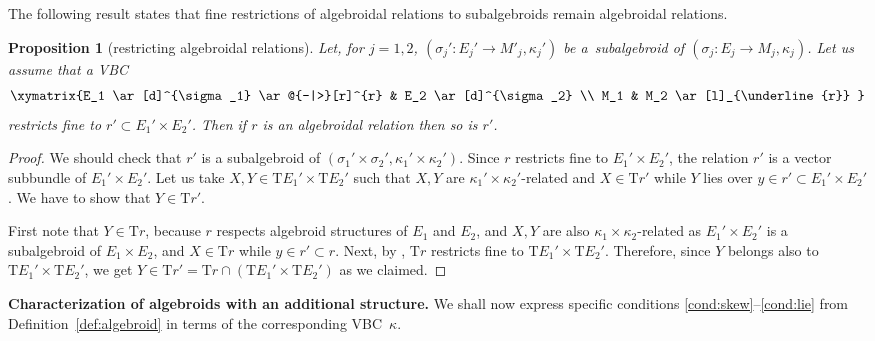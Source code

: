 \documentclass[pdftex]{sigma}
\newcommand{\ZM}{{VBC}} %
\newcommand{\und}{\underline}
\newcommand{\ra}{\rightarrow}
\newcommand{\T}{\mathrm{T}} %
\numberwithin{equation}{section}
\newtheorem{prop}[thm]{Proposition}
\theoremstyle{definition}
\begin{document}
The following result states that fine restrictions of algebroidal relations to subalgebroids remain algebroidal relations.
\begin{prop}[restricting algebroidal relations]\label{prop:sub_r_also_algebroidal}
Let, for $j=1,2$, $(\sigma_j'\colon E_j'\ra M'_j, \kappa_j')$ be a~subalgebroid of $(\sigma_j\colon E_j\ra M_j, \kappa_j)$. Let us assume that a \ZM
\begin{gather*}
 \xymatrix{E_1 \ar[d]^{\sigma_1} \ar@{-|>}[r]^{r} & E_2 \ar[d]^{\sigma_2} \\
M_1 & M_2 \ar[l]_{\und{r}} }
\end{gather*}
restricts fine to $r'\subset E_1'\times E_2'$. Then if $r$ is an algebroidal relation then so is $r'$.
\end{prop}
\begin{proof} We should check that $r'$ is a subalgebroid of $(\sigma_1'\times \sigma_2',\kappa_1'\times\kappa_2')$. Since $r$ restricts fine to $E_1'\times E_2'$, the relation $r'$ is a vector subbundle of $E_1'\times E_2'$. Let us take $X, Y\in \T E_1'\times \T E_2'$ such that $X,Y$ are $\kappa_1'\times \kappa_2'$-related and $X\in \T r'$ while $Y$ lies over $y\in r'\subset E_1'\times E_2'$. We have to show that $Y\in\T r'$.

First note that $Y\in \T r$, because $r$ respects algebroid structures of $E_1$ and $E_2$, and $X, Y$ are also $\kappa_1\times \kappa_2$-related as $E_1'\times E_2'$ is a subalgebroid of $E_1\times E_2$, and $X\in \T r$ while $y\in r'\subset r$. Next, by \cite[Theorem~A.5]{MJ_MR_models_high_alg_2015}, $\T r$ restricts fine to $\T E_1'\times \T E_2'$. Therefore, since $Y$ belongs also to $\T E_1'\times \T E_2'$, we get $Y\in \T r' = \T r\cap (\T E_1'\times \T E_2')$ as we claimed.
\end{proof}

{\bf Characterization of algebroids with an additional structure.} We shall now express specific conditions \eqref{cond:skew}--\eqref{cond:lie} from Definition~\ref{def:algebroid} in terms of the corresponding \ZM\ $\kappa$.
\end{document}
